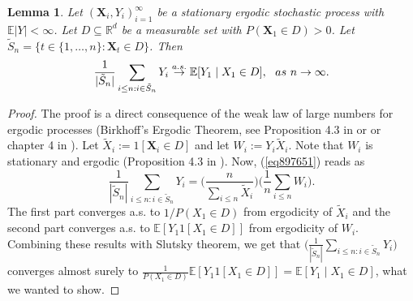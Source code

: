 \documentclass[a4paper,11pt]{article}
\newtheorem{lemma}{Lemma}
\newcommand{\toverset}[2]{\overset{{\rm #1}}{#2}}
\begin{document}
\begin{lemma}
    \label{ergodic_result}
Let $(\textbf{X}_i, Y_i)_{i=1}^{\infty}$ be a stationary ergodic stochastic process with $\mathbb{E}|Y|<\infty$. Let $D\subseteq\mathbb{R}^d$  be a measurable set with $P(\textbf{X}_1\in D)>0$. Let $\tilde{S}_n=\{t\in\{1, \dots, n\}: \textbf{X}_t\in D\}$. Then 
\begin{equation*}\label{eq897651}
    \frac{1}{|\tilde{S}_n|} \sum_{i\leq n: i\in \tilde{S}_n}Y_i \toverset{a.s.}{\to} \mathbb{E}[Y_1\mid \textbf{X}_1\in D], \,\,\,\,as \,\,n\to\infty. 
\end{equation*}
\end{lemma}
\begin{proof}
    The proof is a direct consequence of the weak law of large numbers for ergodic processes (Birkhoff’s Ergodic Theorem, see Proposition 4.3 in \cite{krengel1985ergodic} or  \citep{birkhoff1931proof} or chapter 4 in \cite{pene2022stochastic}). Let $\tilde{X}_i := 1[\textbf{X}_i\in D]$ and let $W_i:=Y_i\tilde{X}_i$. Note that $W_i$ is stationary and ergodic (Proposition 4.3 in \cite{krengel1985ergodic}). Now, (\ref{eq897651}) reads as 
    $$
    \frac{1}{|\tilde{S}_n|} \sum_{i\leq n: i\in \tilde{S}_n}Y_i =    \bigg( \frac{n}{\sum_{i\leq n}\tilde{X}_i}\bigg)   \bigg( \frac{1}{n} \sum_{i\leq n}W_i    \bigg) . 
    $$
The first part converges a.s. to $1/P(X_1\in D)$ from ergodicity of $\tilde{X}_i$ and the second part converges a.s. to $\mathbb{E}[Y_1 1[X_1\in D]]$     from ergodicity of $W_i$. Combining these results with Slutsky theorem, we get that   $\bigg(   \frac{1}{|\tilde{S}_n|} \sum_{i\leq n: i\in \tilde{S}_n}Y_i    \bigg)$ converges almost surely to $\frac{1}{P(X_1\in D)}\mathbb{E}[Y_1 1[X_1\in D]] = \mathbb{E}[Y_1 \mid X_1\in D]$, what we wanted to show. 
\end{proof}
\end{document}
